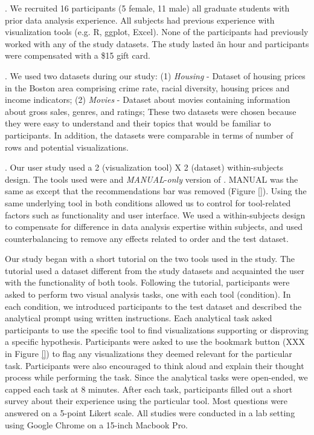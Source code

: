 . We recruited 16 participants (5 female, 11
 male) all graduate students with prior data analysis experience.
 All subjects had previous experience with visualization tools (e.g.
 R, ggplot, Excel).
 None of the participants had previously worked with any of the study datasets.
 The study lasted \~an hour and participants were compensated with a \$15
 gift card.

 . We used two datasets during our study:
 (1) {\em Housing} - Dataset of housing prices in
 the Boston area comprising crime rate, racial diversity, housing prices and
 income indicators; 
 (2) {\em Movies} - Dataset about movies containing information about gross
 sales, genres, and ratings;
 These two datasets were chosen because they were easy to understand and 
 their topics that would be familiar to participants. 
 In addition, the datasets were comparable in terms of number of rows and 
 potential visualizations.

.
Our user study used a 2 (visualization tool) X 2 (dataset) 
within-subjects design.
The tools used were \SeeDB and {\em MANUAL}-{\em only} version of \SeeDB.
MANUAL was the same as \SeeDB except that the recommendations bar was 
removed (Figure \ref{}).
Using the same underlying tool in both conditions allowed us to control for
tool-related factors such as functionality and user interface.
We used a within-subjects design to compensate for difference in data analysis
expertise within subjects, and used counterbalancing to remove any effects 
related to order and the test dataset.

Our study began with a short tutorial on the two tools used in the study.
The tutorial used a dataset different from the study datasets and acquainted
the user with the functionality of both tools.
Following the tutorial, participants were asked to perform two visual analysis 
tasks, one with each tool (condition).
In each condition, we introduced participants to the test dataset
and described the analytical prompt using written instructions.
Each analytical task asked participants to use the specific tool to find 
visualizations supporting or disproving a specific hypothesis.
Participants were asked to use the bookmark button (XXX in Figure \ref{}) to 
flag any visualizations they deemed relevant for the particular task.
Participants were also encouraged to think aloud and explain their thought process
while performing the task.
Since the analytical tasks were open-ended, we capped each task at 8 minutes.
After each task, participants filled out a short survey about their experience
using the particular tool.
Most questions were answered on a 5-point Likert scale.
All studies were conducted in a lab setting using Google Chrome on a 15-inch 
Macbook Pro.

